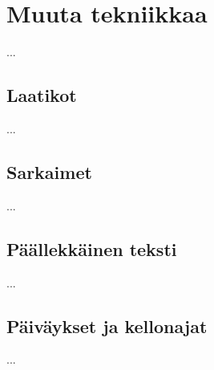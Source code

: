 
\chapter{Muuta tekniikkaa}

...

\section{Laatikot}
\label{luku/laatikot}

...

\section{Sarkaimet}
\label{luku/tabbing}

...


\section{Päällekkäinen teksti}


...

\section{Päiväykset ja kellonajat}

...

